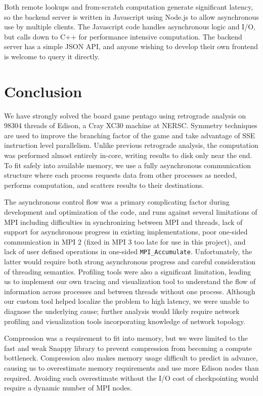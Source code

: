 \documentclass[conference]{IEEEtran}
\begin{document}
Both remote lookups and from-scratch computation generate significant latency, so the backend server is written
in Javascript using Node.js \cite{dahl2014nodejs} to allow asynchronous use by multiple clients.  The Javascript
code handles asynchronous logic and I/O, but calls down to C++ for performance intensive computation.  The backend
server has a simple JSON API, and anyone wishing to develop their own frontend is welcome to query it directly.

\section{Conclusion}

We have strongly solved the board game pentago using retrograde analysis on 98304 threads of Edison, a
Cray XC30 machine at NERSC.  Symmetry techniques are used to improve the branching factor of the game
and take advantage of SSE instruction level parallelism.  Unlike previous retrograde analysis, the computation
was performed almost entirely in-core, writing results to disk only near the end.  To fit safely into available
memory, we use a fully asynchronous communication structure where each process requests data from other
processes as needed, performs computation, and scatters results to their destinations.

The asynchronous control flow was a primary complicating factor during development and optimization of the
code, and runs against several limitations of MPI including difficulties in synchronizing between MPI and threads,
lack of support for asynchronous progress in existing implementations, poor one-sided communication in MPI 2
(fixed in MPI 3 too late for use in this project), and lack of user defined operations in one-sided
\verb+MPI_Accumulate+.  Unfortunately, the latter would require both strong asynchronous progress and careful
consideration of threading semantics.  Profiling tools were also a significant limitation, leading us to implement
our own tracing and visualization tool to understand the flow of information across processes and between threads
without one process.  Although our custom tool helped localize the problem to high latency, we were unable to
diagnose the underlying cause; further analysis would likely require network profiling and visualization tools
incorporating knowledge of network topology.

Compression was a requirement to fit into memory, but we were limited to the fast and weak Snappy library to
prevent compression from becoming a compute bottleneck.  Compression also makes memory usage difficult to
predict in advance, causing us to overestimate memory requirements and use more Edison nodes than required.
Avoiding such overestimate without the I/O cost of checkpointing would require a dynamic number of MPI nodes.
\end{document}
